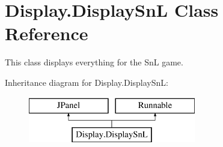 \hypertarget{class_display_1_1_display_sn_l}{}\section{Display.\+Display\+Sn\+L Class Reference}
\label{class_display_1_1_display_sn_l}


This class displays everything for the Sn\+L game.  


Inheritance diagram for Display.\+Display\+Sn\+L\+:\begin{figure}[H]
\begin{center}
\leavevmode
\includegraphics[height=2.000000cm]{class_display_1_1_display_sn_l}
\end{center}
\end{figure}
